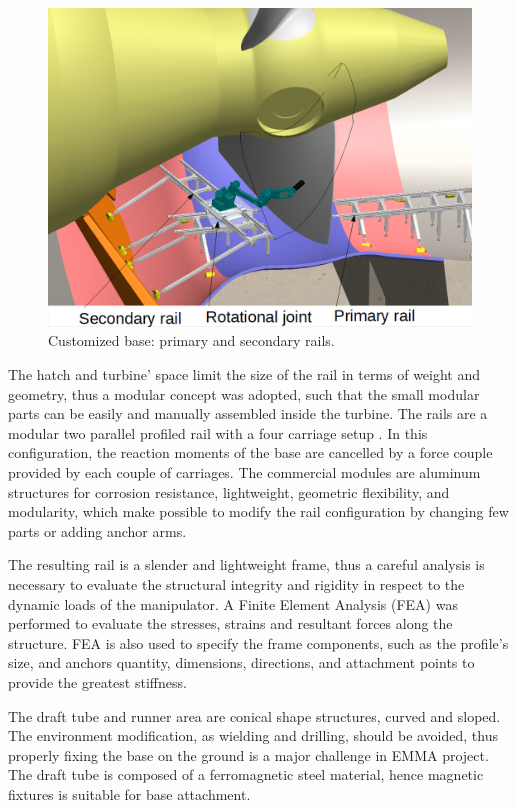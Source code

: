 \begin{figure}
	\centering
	\includegraphics[width=.9\columnwidth]{figs/mecanica/EMMA_Base_Secundaria_02.PNG}
    \caption{Customized base: primary and secondary rails.}
    \label{fig:base}
\end{figure}

The hatch and turbine' space limit the size of the rail in terms of weight
and geometry, thus a modular concept was adopted, such that the small modular
parts can be easily and manually assembled inside the turbine. The rails are a
modular two parallel profiled rail with a four carriage setup%
. In this
configuration, the reaction moments of the base are cancelled by a force couple provided by each couple of
carriages. The commercial modules are aluminum structures for corrosion resistance,
lightweight, geometric flexibility, and modularity, which make possible to
modify the rail configuration by changing few parts or adding
anchor arms.

The resulting rail is a slender and lightweight frame, thus a careful
analysis is necessary to evaluate the structural integrity and rigidity in
respect to the dynamic loads of the manipulator. A Finite Element
Analysis (FEA) was performed to evaluate the stresses, strains and resultant
forces along the structure. FEA is also used to specify the frame components,
such as the profile's size, and anchors quantity, dimensions, directions,
and attachment points to provide the greatest stiffness. 

The draft tube and runner area are conical shape structures, curved and
sloped. The environment modification, as wielding and drilling, should be
avoided, thus properly fixing the base on the ground is a major challenge in
EMMA project. The draft tube is composed of a ferromagnetic steel material,
hence magnetic fixtures is suitable for base attachment. 

